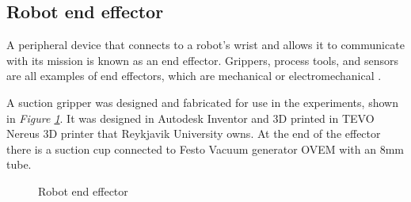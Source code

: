 \subsection{Robot end effector\label{subsec:robotend}}
A peripheral device that connects to a robot's wrist and allows it to communicate with its mission is known as an end effector. Grippers, process tools, and sensors are all examples of end effectors, which are mechanical or electromechanical \cite{wilson_relative_1996}. 

A suction gripper was designed and fabricated for use in the experiments, shown in \textit{Figure \ref{figure: endeffector}}.
It was designed in Autodesk Inventor \cite{noauthor_professional-grade_nodate} and 3D printed in TEVO Nereus 3D printer that Reykjavik University owns. At the end of the effector there is a suction cup connected to Festo Vacuum generator OVEM with an 8mm tube.
\begin{figure}[ht]
 \centering
 \hfill
 \hfill
 \caption{Robot end effector}
 \label{figure: endeffector}
\end{figure}

